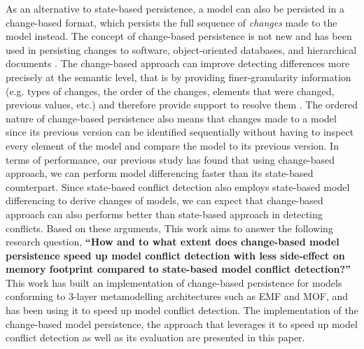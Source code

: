As an alternative to state-based persistence, a model can also be persisted in a change-based format, which persists the full sequence of \emph{changes} made to the model instead. The concept of change-based persistence is not new and has been used in persisting changes to software, object-oriented databases, and hierarchical documents \cite{DBLP:journals/entcs/RobbesL07,DBLP:conf/sde/LippeO92,DBLP:conf/caise/IgnatN05}. The change-based approach can improve detecting differences more precisely at the semantic level, that is by providing finer-granularity information (e.g. types of changes, the order of the changes, 
elements that were changed, previous values, etc.) and therefore provide support to resolve them \cite{mens2002state}. The ordered nature of change-based persistence also means that changes made to a model since its previous version can be identified sequentially without having to inspect every element of the model and compare the model to its previous version. 
In terms of performance, our previous study \cite{yohannis2019efficient} has found that using change-based approach, we can perform model differencing faster than its state-based counterpart. Since state-based conflict detection also employs state-based model differencing to derive changes of models, we can expect that change-based approach can also performs better than state-based approach in detecting conflicts. Based on these arguments, This work aims to answer the following research question, \textbf{``How and to what extent does change-based model persistence speed up model conflict detection with less side-effect on memory footprint compared to state-based model conflict detection?''} This work has built an implementation of change-based persistence for models conforming to 3-layer metamodelling architectures such as EMF and MOF, and has been using it to speed up model conflict detection. The implementation of the change-based model persistence, the approach that leverages it to speed up model conflict detection as well as its evaluation are presented in this paper. 

